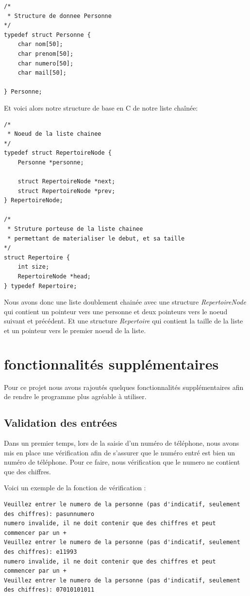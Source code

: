\documentclass[12pt]{report}
\begin{document}
\begin{verbatim}
/*
 * Structure de donnee Personne
*/
typedef struct Personne {
    char nom[50];
    char prenom[50];
    char numero[50];
    char mail[50];

} Personne;
\end{verbatim}


Et voici alors notre structure de base en C de notre liste chaînée:
\begin{verbatim}
/*
 * Noeud de la liste chainee
*/
typedef struct RepertoireNode {
    Personne *personne;

    struct RepertoireNode *next;
    struct RepertoireNode *prev;
} RepertoireNode;

/*
 * Struture porteuse de la liste chainee
 * permettant de materialiser le debut, et sa taille
*/
struct Repertoire {
    int size;
    RepertoireNode *head;
} typedef Repertoire;
\end{verbatim}

Nous avons donc une liste doublement chainée avec une structure \textit{RepertoireNode} qui contient un pointeur vers une personne et deux pointeurs vers le noeud suivant et précédent. Et une structure \textit{Repertoire} qui contient la taille de la liste et un pointeur vers le premier noeud de la liste.

\chapter{fonctionnalités supplémentaires}
Pour ce projet nous avons rajoutés quelques fonctionnalités supplémentaires afin de rendre le programme plus agréable à utiliser.
\section{Validation des entrées}
Dans un premier temps, lors de la saisie d'un numéro de téléphone, nous avons mis en place une vérification afin de s'assurer que le numéro entré est bien un numéro de téléphone. Pour ce faire, nous vérification que le numero ne contient que des chiffres.

Voici un exemple de la fonction de vérification :
\begin{verbatim}
Veuillez entrer le numero de la personne (pas d'indicatif, seulement des chiffres): pasunnumero
numero invalide, il ne doit contenir que des chiffres et peut commencer par un +
Veuillez entrer le numero de la personne (pas d'indicatif, seulement des chiffres): e11993
numero invalide, il ne doit contenir que des chiffres et peut commencer par un +
Veuillez entrer le numero de la personne (pas d'indicatif, seulement des chiffres): 07010101011
\end{verbatim}
\end{document}

